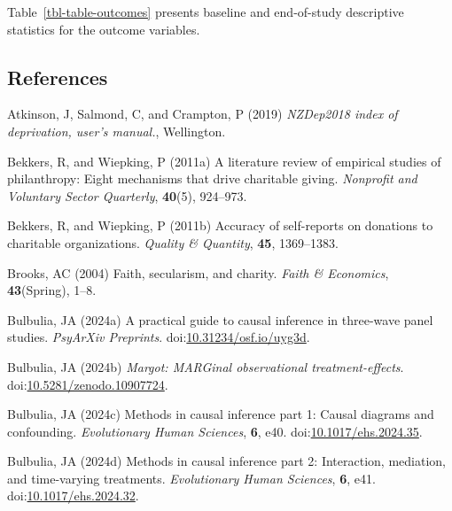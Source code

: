 \documentclass[
  single column]{article}
\newlength{\cslhangindent}
\newenvironment{CSLReferences}[2] %
 {\begin{list}{}{%
  \setlength{\itemindent}{0pt}
  \setlength{\leftmargin}{0pt}
  \setlength{\parsep}{0pt}
  \ifodd #1
   \setlength{\leftmargin}{\cslhangindent}
   \setlength{\itemindent}{-1\cslhangindent}
  \fi
  \setlength{\itemsep}{#2\baselineskip}}}
 {\end{list}}
\begin{document}
Table~\ref{tbl-table-outcomes} presents baseline and end-of-study
descriptive statistics for the outcome variables.

\newpage{}

\subsection*{References}\label{references}

\label{refs}
\begin{CSLReferences}{1}{0}
Atkinson, J, Salmond, C, and Crampton, P (2019) \emph{NZDep2018 index of
deprivation, user{'}s manual.}, Wellington.

Bekkers, R, and Wiepking, P (2011a) A literature review of empirical
studies of philanthropy: Eight mechanisms that drive charitable giving.
\emph{Nonprofit and Voluntary Sector Quarterly}, \textbf{40}(5),
924--973.

Bekkers, R, and Wiepking, P (2011b) Accuracy of self-reports on
donations to charitable organizations. \emph{Quality \& Quantity},
\textbf{45}, 1369--1383.

Brooks, AC (2004) Faith, secularism, and charity. \emph{Faith \&
Economics}, \textbf{43}(Spring), 1--8.

Bulbulia, JA (2024a) A practical guide to causal inference in three-wave
panel studies. \emph{PsyArXiv Preprints}.
doi:\href{https://doi.org/10.31234/osf.io/uyg3d}{10.31234/osf.io/uyg3d}.

Bulbulia, JA (2024b) \emph{Margot: MARGinal observational
treatment-effects}.
doi:\href{https://doi.org/10.5281/zenodo.10907724}{10.5281/zenodo.10907724}.

Bulbulia, JA (2024c) Methods in causal inference part 1: Causal diagrams
and confounding. \emph{Evolutionary Human Sciences}, \textbf{6}, e40.
doi:\href{https://doi.org/10.1017/ehs.2024.35}{10.1017/ehs.2024.35}.

Bulbulia, JA (2024d) Methods in causal inference part 2: Interaction,
mediation, and time-varying treatments. \emph{Evolutionary Human
Sciences}, \textbf{6}, e41.
doi:\href{https://doi.org/10.1017/ehs.2024.32}{10.1017/ehs.2024.32}.


\end{CSLReferences}
\end{document}

